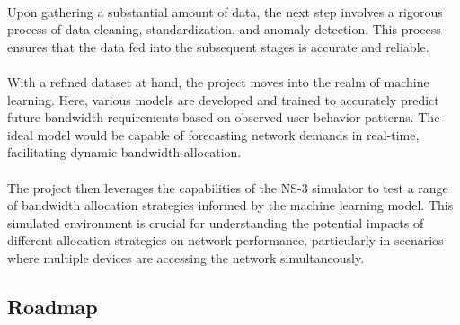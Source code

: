 \documentclass[10pt]{article}
\begin{document}
\paragraph{}
Upon gathering a substantial amount of data, the next step involves a rigorous process of data cleaning, standardization, and anomaly detection. This process ensures that the data fed into the subsequent stages is accurate and reliable.

\paragraph{}
With a refined dataset at hand, the project moves into the realm of machine learning. Here, various models are developed and trained to accurately predict future bandwidth requirements based on observed user behavior patterns. The ideal model would be capable of forecasting network demands in real-time, facilitating dynamic bandwidth allocation.

\paragraph{}
The project then leverages the capabilities of the NS-3 simulator to test a range of bandwidth allocation strategies informed by the machine learning model. This simulated environment is crucial for understanding the potential impacts of different allocation strategies on network performance, particularly in scenarios where multiple devices are accessing the network simultaneously.


\subsection{Roadmap}
\end{document}
